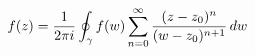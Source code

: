 \documentclass[preview]{standalone}
\begin{document}
\begin{align*}
\special{dvisvgm:raw <g id='unique000'>}f(z) = \frac{1}{2\pi i} \oint_{\gamma} f(w) \sum_{n=0}^{\infty} \frac{(z-z_0)^n}{(w-z_0)^{n+1}}\, dw\special{dvisvgm:raw </g>}
\end{align*}
\end{document}

